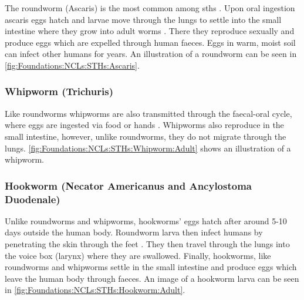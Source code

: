 The roundworm (Ascaris) is the most common among \acp{sth} \cite{jamison2006helminth}. Upon oral ingestion ascaris eggs hatch and larvae move through the lungs to settle into the small intestine where they grow into adult worms \cite{jourdan2018soiltransmitted}. There they reproduce sexually and produce eggs which are expelled through human faeces. Eggs in warm, moist soil can infect other humans for years. An illustration of a roundworm can be seen in \autoref{fig:Foundations:NCLs:STHs:Ascaris}.

\subsubsection{Whipworm (Trichuris)}
\label{sec:Foundations:NTDs:STHs:Whipworm}

Like roundworms whipworms are also transmitted through the faecal-oral cycle, where eggs are ingested via food or hands \cite{jourdan2018soiltransmitted}. Whipworms also reproduce in the small intestine, however, unlike roundworms, they do not migrate through the lungs. \autoref{fig:Foundations:NCLs:STHs:Whipworm:Adult} shows an illustration of a whipworm.

\subsubsection{Hookworm (Necator Americanus and Ancylostoma Duodenale)}
\label{sec:Foundations:NTDs:STHs:Hookworm}

Unlike roundworms and whipworms, hookworms' eggs hatch after around 5-10 days outside the human body. Roundworm larva then infect humans by penetrating the skin through the feet \cite{jourdan2018soiltransmitted}. They then travel through the lungs into the voice box (larynx) where they are swallowed. Finally, hookworms, like roundworms and whipworms settle in the small intestine and produce eggs which leave the human body through faeces. An image of a hookworm larva can be seen in \autoref{fig:Foundations:NCLs:STHs:Hookworm:Adult}.

